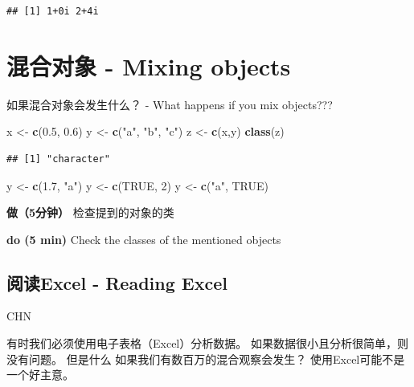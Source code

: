 \documentclass[]{book}
\newenvironment{Shaded}{\begin{snugshade}}{\end{snugshade}}
\newcommand{\DecValTok}[1]{\textcolor[rgb]{0.00,0.00,0.81}{#1}}
\newcommand{\FloatTok}[1]{\textcolor[rgb]{0.00,0.00,0.81}{#1}}
\newcommand{\KeywordTok}[1]{\textcolor[rgb]{0.13,0.29,0.53}{\textbf{#1}}}
\newcommand{\NormalTok}[1]{#1}
\newcommand{\OtherTok}[1]{\textcolor[rgb]{0.56,0.35,0.01}{#1}}
\newcommand{\StringTok}[1]{\textcolor[rgb]{0.31,0.60,0.02}{#1}}
\begin{document}
\begin{verbatim}
## [1] 1+0i 2+4i
\end{verbatim}

\hypertarget{mixing-objects}{%
\section{混合对象 - Mixing objects}\label{mixing-objects}}

如果混合对象会发生什么？ - What happens if you mix objects???

\begin{Shaded}
\begin{Highlighting}[]
\NormalTok{x <-}\StringTok{ }\KeywordTok{c}\NormalTok{(}\FloatTok{0.5}\NormalTok{, }\FloatTok{0.6}\NormalTok{)}
\NormalTok{y <-}\StringTok{ }\KeywordTok{c}\NormalTok{(}\StringTok{"a"}\NormalTok{, }\StringTok{"b"}\NormalTok{, }\StringTok{"c"}\NormalTok{)}
\NormalTok{z <-}\StringTok{ }\KeywordTok{c}\NormalTok{(x,y)}
\KeywordTok{class}\NormalTok{(z)}
\end{Highlighting}
\end{Shaded}

\begin{verbatim}
## [1] "character"
\end{verbatim}

\begin{Shaded}
\begin{Highlighting}[]
\NormalTok{y <-}\StringTok{ }\KeywordTok{c}\NormalTok{(}\FloatTok{1.7}\NormalTok{, }\StringTok{"a"}\NormalTok{)}
\NormalTok{y <-}\StringTok{ }\KeywordTok{c}\NormalTok{(}\OtherTok{TRUE}\NormalTok{, }\DecValTok{2}\NormalTok{)}
\NormalTok{y <-}\StringTok{ }\KeywordTok{c}\NormalTok{(}\StringTok{"a"}\NormalTok{, }\OtherTok{TRUE}\NormalTok{)}
\end{Highlighting}
\end{Shaded}

\textbf{做（5分钟）}
检查提到的对象的类

\textbf{do (5 min)}
Check the classes of the mentioned objects

\hypertarget{excel---reading-excel}{%
\subsection{阅读Excel - Reading Excel}\label{excel---reading-excel}}

CHN

有时我们必须使用电子表格（Excel）分析数据。 如果数据很小且分析很简单，则没有问题。 但是什么
如果我们有数百万的混合观察会发生？ 使用Excel可能不是一个好主意。
\end{document}
